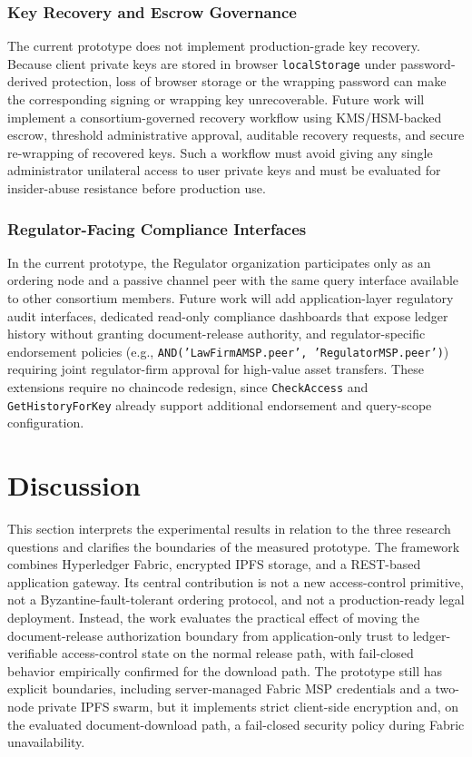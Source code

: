 \documentclass{ieeeaccess}
\begin{document}
\subsubsection{Key Recovery and Escrow Governance}
\label{sec:key_recovery_escrow}
The current prototype does not implement production-grade key recovery.
Because client private keys are stored in browser \texttt{localStorage}
under password-derived protection, loss of browser storage or the wrapping
password can make the corresponding signing or wrapping key unrecoverable.
Future work will implement a consortium-governed recovery workflow using
KMS/HSM-backed escrow, threshold administrative approval, auditable recovery
requests, and secure re-wrapping of recovered keys. Such a workflow must
avoid giving any single administrator unilateral access to user private keys
and must be evaluated for insider-abuse resistance before production use.

\subsubsection{Regulator-Facing Compliance Interfaces}
\label{sec:regulator_interfaces}
In the current prototype, the Regulator organization participates only as
an ordering node and a passive channel peer with the same query interface
available to other consortium members. Future work will add
application-layer regulatory audit interfaces, dedicated read-only
compliance dashboards that expose ledger history without granting
document-release authority, and regulator-specific endorsement policies
(e.g., \texttt{AND('LawFirmAMSP.peer', 'RegulatorMSP.peer')}) requiring
joint regulator-firm approval for high-value asset transfers. These
extensions require no chaincode redesign, since \texttt{CheckAccess} and
\texttt{GetHistoryForKey} already support additional endorsement and
query-scope configuration.
\FloatBarrier
\section{Discussion}
\label{sec:discussion}

This section interprets the experimental results in relation to the three
research questions and clarifies the boundaries of the measured prototype.
The framework combines Hyperledger Fabric, encrypted IPFS storage, and a
REST-based application gateway. Its central contribution is not a new
access-control primitive, not a Byzantine-fault-tolerant ordering protocol,
and not a production-ready legal deployment. Instead, the work evaluates the
practical effect of moving the document-release authorization boundary from
application-only trust to ledger-verifiable access-control state on the
normal release path, with fail-closed behavior empirically confirmed for the
download path. The prototype still has explicit boundaries, including
server-managed Fabric MSP credentials and a two-node private IPFS swarm, but
it implements strict client-side encryption and, on the evaluated
document-download path, a fail-closed security policy during Fabric
unavailability.
\end{document}
